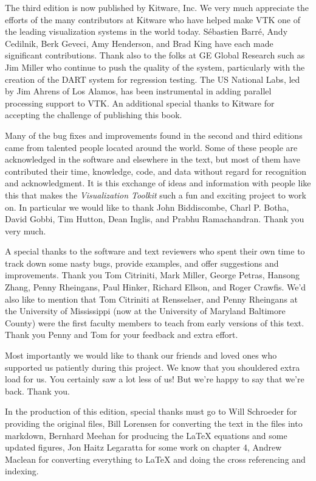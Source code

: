 The third edition is now published by Kitware, Inc. We very much appreciate the efforts of the many contributors at Kitware who have helped make VTK one of the leading visualization systems in the world today. Sébastien Barré, Andy Cedilnik, Berk Geveci, Amy Henderson, and Brad King have each made significant contributions. Thank also to the folks at GE Global Research such as Jim Miller who continue to push the quality of the system, particularly with the creation of the DART system for regression testing. The US National Labs, led by Jim Ahrens of Los Alamos, has been instrumental in adding parallel processing support to VTK. An additional special thanks to Kitware for accepting the challenge of publishing this book.

Many of the bug fixes and improvements found in the second and third editions came from talented people located around the world. Some of these people are acknowledged in the software and elsewhere in the text, but most of them have contributed their time, knowledge, code, and data without regard for recognition and acknowledgment. It is this exchange of ideas and information with people like this that makes the \emph{Visualization Toolkit} such a fun and exciting project to work on. In particular we would like to thank John Biddiscombe, Charl P. Botha, David Gobbi, Tim Hutton, Dean Inglis, and Prabhu Ramachandran. Thank you very much.

A special thanks to the software and text reviewers who spent their own time to track down some nasty bugs, provide examples, and offer suggestions and improvements. Thank you Tom Citriniti, Mark Miller, George Petras, Hansong Zhang, Penny Rheingans, Paul Hinker, Richard Ellson, and Roger Crawfis. We'd also like to mention that Tom Citriniti at Rensselaer, and Penny Rheingans at the University of Mississippi (now at the University of Maryland Baltimore County) were the first faculty members to teach from early versions of this text. Thank you Penny and Tom for your feedback and extra effort.

Most importantly we would like to thank our friends and loved ones who supported us patiently during this project. We know that you shouldered extra load for us. You certainly saw a lot less of us! But we're happy to say that we're back. Thank you.

In the production of this edition, special thanks must go to Will Schroeder for providing the original files, Bill Lorensen for converting the text in the files into markdown, Bernhard Meehan for producing the LaTeX equations and some updated figures, Jon Haitz Legaratta for some work on chapter 4, Andrew Maclean for converting everything to LaTeX and doing the cross referencing and indexing.

